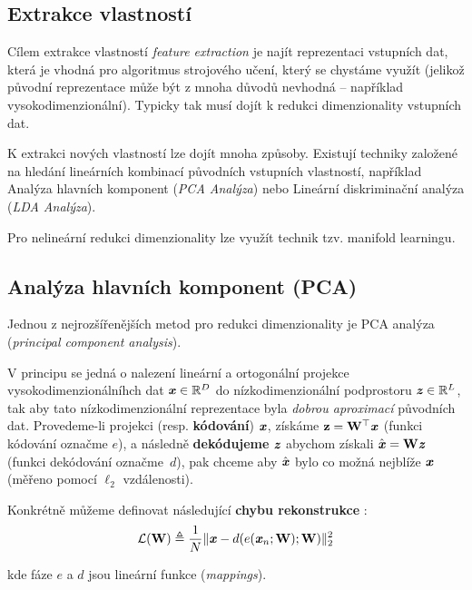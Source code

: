 \subsection{Extrakce vlastností}
Cílem extrakce vlastností \emph{feature extraction} je najít reprezentaci vstupních dat, která je vhodná pro algoritmus strojového učení, který se chystáme využít (jelikož původní reprezentace může být z mnoha důvodů nevhodná – například vysokodimenzionální).
Typicky tak musí dojít k redukci dimenzionality vstupních dat. \cite{Liu1998}

K extrakci nových vlastností lze dojít mnoha způsoby.
Existují techniky založené na hledání lineárních kombinací původních vstupních vlastností, například Analýza hlavních komponent (\emph{PCA Analýza}) nebo Lineární diskriminační analýza (\emph{LDA Analýza}).

Pro nelineární redukci dimenzionality lze využít technik tzv. manifold learningu.


\subsection{Analýza hlavních komponent (PCA)}
\label{sec:pca}
Jednou z nejrozšířenějších metod pro redukci dimenzionality je PCA analýza (\emph{principal component analysis}).

V principu se jedná o nalezení lineární a ortogonální projekce vysokodimenzionálníhch dat $\textbf{\emph{x}} \in \mathbb{R}^D$ do nízkodimenzionální podprostoru  $\textbf{\emph{z}} \in \mathbb{R}^L$,
tak aby tato nízkodimenzionální reprezentace byla \emph{dobrou aproximací} původních dat.
Provedeme-li projekci (resp. \textbf{kódování}) $\textbf{\emph{x}}$, získáme $\mathbf{z} = \mathbf{W^{\top}} \textbf{\emph{x}}$ (funkci kódování označme $e$),
a následně \textbf{dekódujeme} $\textbf{\emph{z}}$ abychom získali $\hat{\textbf{\emph{x}}} = \mathbf{W}\textbf{\emph{z}}$ (funkci dekódování označme $d$),
pak chceme aby $\hat{\textbf{\emph{x}}}$ bylo co možná nejblíže $\textbf{\emph{x}}$ (měřeno pomocí $\ell_2$ vzdálenosti). \cite{Murphy2022}

Konkrétně můžeme definovat následující \textbf{chybu rekonstrukce} \cite{Murphy2022}:
\begin{equation}
    \mathcal{L}(\mathbf{W}) \triangleq \frac{1}{N} \| \textbf{\emph{x}} - d(e(\textbf{\emph{x}}_n; \mathbf{W}); \mathbf{W})\|^2_2
\end{equation}

kde fáze $e$ a $d$ jsou lineární funkce (\emph{mappings}).

